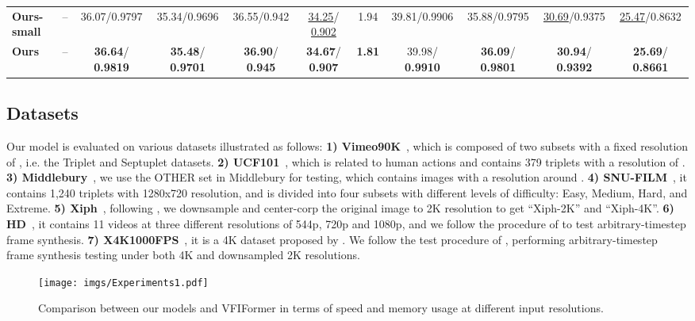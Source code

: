 \documentclass[10pt,twocolumn,letterpaper]{article}
\newcommand{\first}[1]{{\color{red} \textbf{#1}}}
\newcommand{\second}[1]{{\color{blue} \underline{#1}}}
\begin{document}
\begin{table*}[t]
{\begin{tabular}{lcccccccccc}
            \textbf{Ours-small}&-- & 36.07/0.9797 & 35.34/0.9696& 36.55/0.942 & \second{34.25}/\second{0.902} & 1.94 &  39.81/0.9906 & 35.88/0.9795 & \second{30.69}/0.9375 & \second{25.47}/0.8632  \\
            \textbf{Ours}&-- &  \first{36.64}/\first{0.9819} & \first{35.48}/\first{0.9701} & \first{36.90}/\first{0.945} & \first{34.67}/\first{0.907} & \first{1.81} & 39.98/\first{0.9910} & \first{36.09}/\first{0.9801} & \first{30.94}/\first{0.9392} & \first{25.69}/\first{0.8661}  \\
			\bottomrule 
	\end{tabular}}
	\label{table:quantitative1}
	\vspace{-0.10in}
\end{table*}
	
    \subsection{Datasets}
    Our model is evaluated on various datasets illustrated as follows: \textbf{1) Vimeo90K}~\cite{xue2019video}, which is composed of two subsets with a fixed resolution of , i.e. the Triplet and Septuplet datasets.  \textbf{2) UCF101}~\cite{soomro2012ucf101}, which is related to human actions and contains 379 triplets with a resolution of . \textbf{3) Middlebury}~\cite{baker2011database}, we use the OTHER set in Middlebury for testing, which contains images with a resolution around . \textbf{4) SNU-FILM}~\cite{choi2020channel}, it contains 1,240 triplets with 1280x720 resolution, and is divided into four subsets with different levels of difficulty: Easy, Medium, Hard, and Extreme. \textbf{5) Xiph}~\cite{xphi1994}, following \cite{niklaus2020softmax}, we downsample and center-corp the original image to 2K resolution to get ``Xiph-2K'' and ``Xiph-4K''. \textbf{6) HD}~\cite{bao2019memc}, it contains 11 videos at three different resolutions of 544p, 720p and 1080p, and we follow the procedure of \cite{huang2020rife} to test arbitrary-timestep frame synthesis. \textbf{7) X4K1000FPS}~\cite{sim2021xvfi}, it is a 4K dataset proposed by \cite{sim2021xvfi}. We follow the test procedure of \cite{hu2022many}, performing arbitrary-timestep frame synthesis testing under both 4K and downsampled 2K resolutions.
    
    \begin{figure}[t]
		\begin{center}
\texttt{[image: imgs/Experiments1.pdf]}
		\end{center}
            \vspace{-0.2in}
		\caption{Comparison between our models and VFIFormer in terms of speed and memory usage at different input resolutions.}
		\label{fig:st}
		\vspace{-0.2in}
    \end{figure}
    
\end{document}
